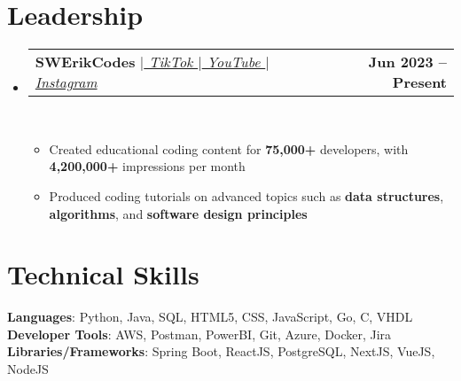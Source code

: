 \documentclass[letterpaper,11pt]{article}
\makeatletter
\newcommand{\resumeItem}[1]{
  \item\small{
    {#1 \vspace{0pt}}
  }
}
\newcommand{\resumeProjectHeading}[2]{
    \item
    \begin{tabular*}{1.001\textwidth}{l@{\extracolsep{\fill}}r}
      \small#1 & \textbf{\small #2}\\
    \end{tabular*}\vspace{-7pt}
}
\newcommand{\resumeSubHeadingListStart}{\begin{itemize}[leftmargin=0.0in, label={}]}
\newcommand{\resumeSubHeadingListEnd}{\end{itemize}}\vspace{0pt}
\newcommand{\resumeItemListStart}{\begin{itemize}}
\newcommand{\resumeItemListEnd}{\end{itemize}\vspace{-5pt}}
\makeatother
\begin{document}
\section{Leadership} 
    \vspace{-5pt}
    \resumeSubHeadingListStart
                   \resumeProjectHeading
            {\textbf{{SWErikCodes}} $|$\emph{{\href{https://www.tiktok.com/@swerikcodes?lang=en}{ TikTok $|$}\href{https://www.youtube.com/channel/UCgKFOz_KrMbmypWrawtzDQg}{ YouTube $|$}\href{https://www.instagram.com/swerikcodes/}{ Instagram}}}}{Jun 2023 -- Present}
            \\[5mm]
          \resumeItemListStart
            \resumeItem{Created educational coding content for \textbf{75,000+} developers, with \textbf{4,200,000+} impressions per month}
            \resumeItem{Produced coding tutorials on advanced topics such as \textbf{data structures}, \textbf{algorithms}, and \textbf{software design principles}}
          \resumeItemListEnd
          \resumeSubHeadingListEnd
 \vspace{-12pt}
\section{Technical Skills}
 \begin{itemize}[leftmargin=0.15in, label={}]
    \small{\item{   
     \textbf{Languages}{: Python, Java, SQL, HTML5, CSS, JavaScript, Go, C, VHDL} \\[1mm]
     \textbf{Developer Tools}{: AWS, Postman, PowerBI, Git, Azure, Docker, Jira} \\[1mm]
     \textbf{Libraries/Frameworks}{: Spring Boot, ReactJS, PostgreSQL, NextJS, VueJS, NodeJS} \\ [1mm]
    }}
 \end{itemize}
 \vspace{-16pt}
 \vspace{3pt}
\vspace{10pt}

\vspace{-15pt}
\end{document}
